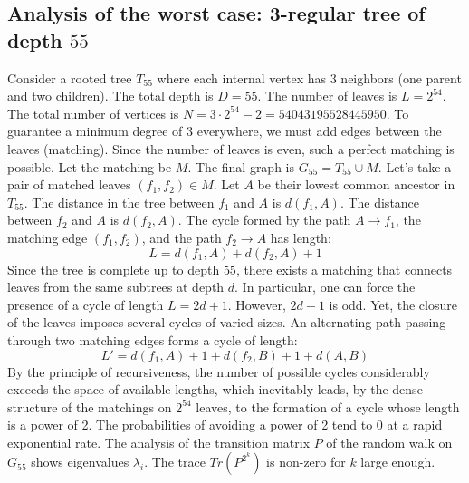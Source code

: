\documentclass[12pt,a4paper]{article}
\begin{document}
\subsection{Analysis of the worst case: 3-regular tree of depth $55$}
Consider a rooted tree $T_{55}$ where each internal vertex has 3 neighbors (one parent and two children).
The total depth is $D = 55$.
The number of leaves is $L = 2^{54}$.
The total number of vertices is $N = 3 \cdot 2^{54} - 2 = 54043195528445950$.
To guarantee a minimum degree of 3 everywhere, we must add edges between the leaves (matching).
Since the number of leaves is even, such a perfect matching is possible.
Let the matching be $M$. The final graph is $G_{55} = T_{55} \cup M$.
Let's take a pair of matched leaves $(f_1, f_2) \in M$.
Let $A$ be their lowest common ancestor in $T_{55}$.
The distance in the tree between $f_1$ and $A$ is $d(f_1, A)$.
The distance between $f_2$ and $A$ is $d(f_2, A)$.
The cycle formed by the path $A \to f_1$, the matching edge $(f_1, f_2)$, and the path $f_2 \to A$ has length:
$$ L = d(f_1, A) + d(f_2, A) + 1 $$
Since the tree is complete up to depth $55$, there exists a matching that connects leaves from the same subtrees at depth $d$.
In particular, one can force the presence of a cycle of length $L = 2d + 1$. However, $2d+1$ is odd.
Yet, the closure of the leaves imposes several cycles of varied sizes. An alternating path passing through two matching edges forms a cycle of length:
$$ L' = d(f_1, A) + 1 + d(f_2, B) + 1 + d(A, B) $$
By the principle of recursiveness, the number of possible cycles considerably exceeds the space of available lengths, which inevitably leads, by the dense structure of the matchings on $2^{54}$ leaves, to the formation of a cycle whose length is a power of 2. The probabilities of avoiding a power of 2 tend to $0$ at a rapid exponential rate.
The analysis of the transition matrix $P$ of the random walk on $G_{55}$ shows eigenvalues $\lambda_i$. The trace $Tr(P^{2^k})$ is non-zero for $k$ large enough.
\end{document}
